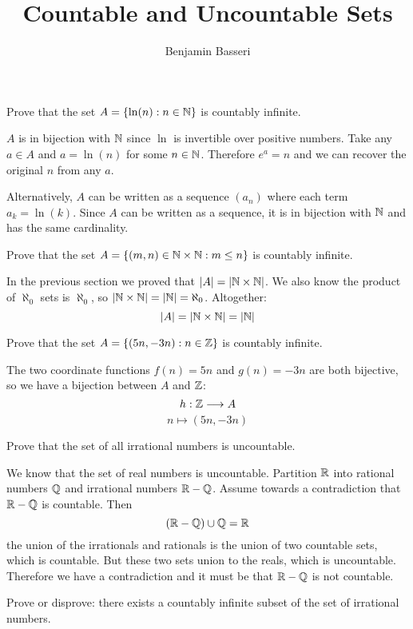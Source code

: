 \documentclass{article}
\title{Countable and Uncountable Sets}
\author{Benjamin Basseri}
\begin{document}
\maketitle

\begin{problem}
Prove that the set $A = \{\ln(n): n \in \mathbb{N}\}$ is countably infinite.
\end{problem}

$A$ is in bijection with $\mathbb{N}$ since $\ln$ is invertible over positive numbers. Take any $a \in A$ and $a = \ln(n)$ for some $n \in \mathbb{N}$. Therefore $e^a = n$ and we can recover the original $n$ from any $a$.

Alternatively, $A$ can be written as a sequence $(a_n)$ where each term $a_k = \ln(k)$. Since $A$ can be written as a sequence, it is in bijection with $\mathbb{N}$ and has the same cardinality.

\begin{problem}
Prove that the set $A = \{(m, n) \in \mathbb{N} \times \mathbb{N}: m \leq n\}$ is countably infinite.
\end{problem}

In the previous section we proved that $|A| = |\mathbb{N} \times \mathbb{N}|$. We also know the product of $\aleph_0$ sets is $\aleph_0$, so $|\mathbb{N} \times \mathbb{N}| = |\mathbb{N}| = \aleph_0$. Altogether:
$$|A| = |\mathbb{N} \times \mathbb{N}| = |\mathbb{N}|$$

\begin{problem}
Prove that the set $A = \{(5n, -3n): n \in \mathbb{Z}\}$ is countably infinite.
\end{problem}

The two coordinate functions $f(n) = 5n$ and $g(n) = -3n$ are both bijective, so we have a bijection between $A$ and $\mathbb{Z}$:
$$h: \mathbb{Z} \longrightarrow A$$
$$n \longmapsto (5n, -3n)$$

\begin{problem}
Prove that the set of all irrational numbers is uncountable.
\end{problem}

We know that the set of real numbers is uncountable. Partition $\mathbb{R}$ into rational numbers $\mathbb{Q}$ and irrational numbers $\mathbb{R} - \mathbb{Q}$. Assume towards a contradiction that $\mathbb{R} - \mathbb{Q}$ is countable. Then
$$(\mathbb{R} - \mathbb{Q}) \cup \mathbb{Q} = \mathbb{R}$$
the union of the irrationals and rationals is the union of two countable sets, which is countable. But these two sets union to the reals, which is uncountable. Therefore we have a contradiction and it must be that $\mathbb{R} - \mathbb{Q}$ is not countable.

\begin{problem}
Prove or disprove: there exists a countably infinite subset of the set of irrational numbers.
\end{problem}
\end{document}
